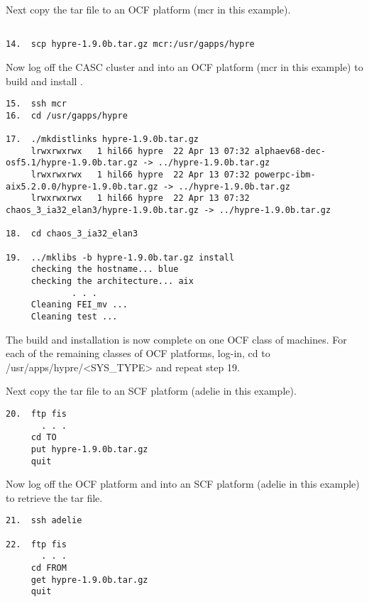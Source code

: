 Next copy the tar file to an OCF platform (mcr in this example).
\begin{verbatim}

14.  scp hypre-1.9.0b.tar.gz mcr:/usr/gapps/hypre

\end{verbatim}

Now log off the CASC cluster and into an OCF platform (mcr in this example) to build and 
install \hypre{}.
\begin{verbatim}
15.  ssh mcr
16.  cd /usr/gapps/hypre

17.  ./mkdistlinks hypre-1.9.0b.tar.gz
     lrwxrwxrwx   1 hil66 hypre  22 Apr 13 07:32 alphaev68-dec-osf5.1/hypre-1.9.0b.tar.gz -> ../hypre-1.9.0b.tar.gz
     lrwxrwxrwx   1 hil66 hypre  22 Apr 13 07:32 powerpc-ibm-aix5.2.0.0/hypre-1.9.0b.tar.gz -> ../hypre-1.9.0b.tar.gz
     lrwxrwxrwx   1 hil66 hypre  22 Apr 13 07:32 chaos_3_ia32_elan3/hypre-1.9.0b.tar.gz -> ../hypre-1.9.0b.tar.gz

18.  cd chaos_3_ia32_elan3

19.  ../mklibs -b hypre-1.9.0b.tar.gz install
     checking the hostname... blue
     checking the architecture... aix
             . . .
     Cleaning FEI_mv ...
     Cleaning test ...
\end{verbatim}
The build and installation is now complete on one OCF class of machines. For each of the
remaining classes of OCF platforms, log-in, cd to /usr/apps/hypre/<SYS\_TYPE> and repeat
step 19.

Next copy the tar file to an SCF platform (adelie in this example).
\begin{verbatim}
20.  ftp fis
       . . . 
     cd TO
     put hypre-1.9.0b.tar.gz
     quit
\end{verbatim}

Now log off the OCF platform and into an SCF platform (adelie in this example) to retrieve
the tar file.
\begin{verbatim}
21.  ssh adelie

22.  ftp fis
       . . . 
     cd FROM
     get hypre-1.9.0b.tar.gz
     quit
\end{verbatim}

